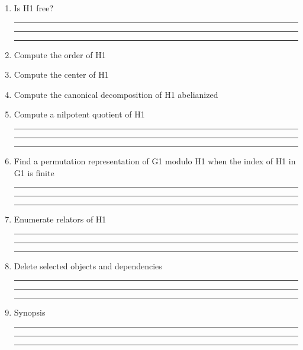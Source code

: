 \begin{enumerate}
\item Is H1 free?


\bigskip
\hrule\hrule\hrule


\item Compute the order of H1

\item Compute the center of H1

\item Compute the canonical decomposition of H1 abelianized

\item Compute a nilpotent quotient of H1

\bigskip
\hrule\hrule\hrule

\item Find a permutation representation of G1 modulo H1 when the index
of H1 in G1 is finite

\bigskip
\hrule\hrule\hrule

\item Enumerate relators of H1

\bigskip
\hrule\hrule\hrule

\item Delete selected objects and dependencies

\bigskip
\hrule\hrule\hrule

\item
Synopsis

\bigskip
\hrule\hrule\hrule

\end{enumerate}
